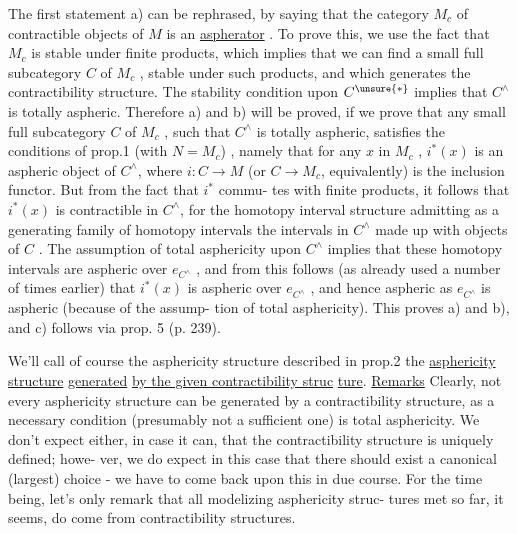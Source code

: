 
 The first statement a) can be rephrased,  by saying that
 the category $M_c$ of contractible objects of $M$ is an \uline{aspherator} .  To
prove this,  we use the fact that $M_c$ is stable under finite products,
which implies that we can find a small full subcategory  $C$ of $M_c$ ,
stable under such products,  and which generates the contractibility
structure.  The stability condition upon $C^{\unsure{*}}$ implies that $C^{\wedge}$\hand{/}is totally
aspheric.  Therefore a) and b) will be proved,  if we prove that any
small full subcategory $C$ of $M_c$ ,  such that $C^{\wedge}$ is totally aspheric,
satisfies the conditions of prop.1 (with $N=M_c$) ,  namely that for any
$x$ in $M_c$ ,  $i^{*}(x)$ is an aspheric object of $C^{\wedge}$,  where $i\colon C\to M$  (or $C\to M_c$,
equivalently) is the inclusion functor.  But from the fact that $i^{*}$ commu-%
tes with finite products,  it follows that $i^{*}(x)$  is contractible in $C^{\wedge}$,
for the  homotopy interval structure admitting as a generating
family of homotopy intervals the intervals in $C^{\wedge}$ made up with objects of
$C$ .  The assumption of total asphericity upon $C^{\wedge}$ implies that these
homotopy intervals are aspheric over $e_{C^{\wedge}}$ ,  and from this follows 
(as already used a number of times earlier)  that $i^{*}(x)$  is aspheric
over $e_{C^{\wedge}}$ ,  and hence aspheric as $e_{C^{\wedge}}$ is aspheric (because of the assump-%
tion of total asphericity).  This proves a) and b),  and c) follows via
prop. 5 (p. 239).

We'll call of course the asphericity structure described in prop.2
the \uline{asphericity} \uline{structure} \uline{generated} \uline{by the given contractibility struc}
\uline{ture}.
\uline{Remarks} Clearly,  not every asphericity structure can be generated by a
contractibility structure,  as a necessary condition (presumably not a
sufficient one) is total asphericity.  We don't expect either,  in case
 it can,  that the  contractibility structure is uniquely defined;  howe-%
ver,  we do expect in this case that there should exist a canonical
(largest) choice - we have to come back upon this in due course. For
the time being,  let's only remark that all modelizing asphericity struc-%
tures met  so far,  it seems,  do come from contractibility structures.

